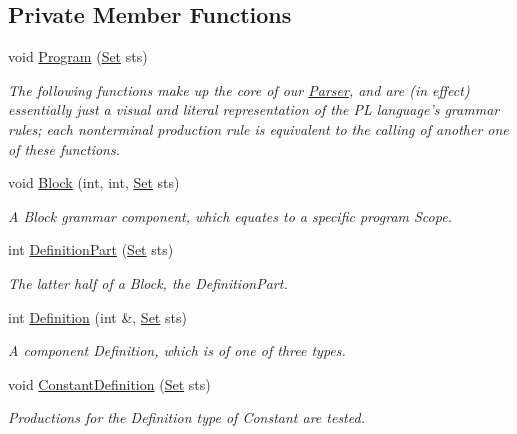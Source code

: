 \subsection*{Private Member Functions}
\begin{DoxyCompactItemize}
\item 
void \hyperlink{classParser_a068fd2e519704d6fbaf9c8ecb3469e49}{Program} (\hyperlink{classSet}{Set} sts)
\begin{DoxyCompactList}\small\item\em The following functions make up the core of our \hyperlink{classParser}{Parser}, and are (in effect) essentially just a visual and literal representation of the PL language's grammar rules; each nonterminal production rule is equivalent to the calling of another one of these functions. \item\end{DoxyCompactList}\item 
void \hyperlink{classParser_a229a836b6e6d8dce8826647fb430d99d}{Block} (int, int, \hyperlink{classSet}{Set} sts)
\begin{DoxyCompactList}\small\item\em A Block grammar component, which equates to a specific program Scope. \item\end{DoxyCompactList}\item 
int \hyperlink{classParser_abc03fca869e43a1e72a28422fb96b8cb}{DefinitionPart} (\hyperlink{classSet}{Set} sts)
\begin{DoxyCompactList}\small\item\em The latter half of a Block, the DefinitionPart. \item\end{DoxyCompactList}\item 
int \hyperlink{classParser_a164c3a4ff56a3c75d9d26c8c47178b68}{Definition} (int \&, \hyperlink{classSet}{Set} sts)
\begin{DoxyCompactList}\small\item\em A component Definition, which is of one of three types. \item\end{DoxyCompactList}\item 
void \hyperlink{classParser_abb393c5891c5a48e7be396bb6249ee4b}{ConstantDefinition} (\hyperlink{classSet}{Set} sts)
\begin{DoxyCompactList}\small\item\em Productions for the Definition type of Constant are tested. \item\end{DoxyCompactList}\item 

\end{DoxyCompactItemize}

